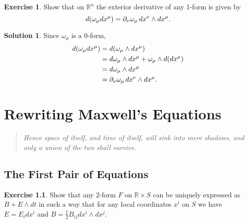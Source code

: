 \documentclass[11pt, a4paper]{report}
\theoremstyle{definition}
\newtheorem{exercise}{Exercise}[part]
\newtheorem{solution}{Solution}[part]
\newenvironment{ex}{\begin{exercise}}{\end{exercise}\pagebreak[1]}
\newenvironment{sol}{\begin{solution}}{\end{solution}\pagebreak[3]}
\newenvironment{epigraph}
    {\begin{quote}\small\itshape} %
    {\end{quote}\ignorespacesafterend\vspace{\parskip}}
\newcommand*{\op}[1]{\ensuremath\mathop{}\mathopen{}#1}
\renewcommand*{\d}{\op{d}}
\begin{document}
\begin{ex}

Show that on $\mathbb{R}^n$ the exterior derivative of any 1-form is given by
\[
    d(\omega_\mu dx^\mu) = \partial_\nu \omega_\mu \d x^\nu \wedge dx^\mu.
\]

\end{ex}

\begin{sol}

Since $\omega_\mu$ is a 0-form,
\begin{align*}
    d(\omega_\mu dx^\mu) &= d(\omega_\mu \wedge dx^\mu) \\
        &= d\omega_\mu \wedge dx^\mu + \omega_\mu \wedge d(dx^\mu) \\
        &= d\omega_\mu \wedge dx^\mu \\
        &= \partial_\nu \omega_\mu \d x^\nu \wedge dx^\mu.
\end{align*}

\end{sol}

\chapter{Rewriting Maxwell's Equations}

\begin{epigraph}
    Hence space of itself, and time of itself, will sink into mere shadows, and only a union of the two shall survive.
\end{epigraph}

\section{The First Pair of Equations}

\begin{ex}

Show that any 2-form $F$ on $\mathbb{R} \times S$ can be uniquely expressed as $B + E \wedge dt$ in such a way that for any local coordinates $x^i$ on $S$ we have $E = E_i dx^i$ and $B = \frac{1}{2}B_{ij}dx^i \wedge dx^j$.

\end{ex}
\end{document}
